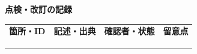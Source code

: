 \documentclass[11pt,a4paper]{article}
\begin{document}
\par{}\noindent\textbf{点検・改訂の記録}\par\vspace{1mm}
{\fontsize{8.5}{13}\selectfont
\begin{tabularx}{\linewidth}{@{}XXXX@{}}
\textbf{箇所・ID} & \textbf{記述・出典} & \textbf{確認者・状態} & \textbf{留意点}\\[2mm]
\strut & \strut & \strut & \strut\\[5mm]
\strut & \strut & \strut & \strut\\[5mm]
\strut & \strut & \strut & \strut\\[5mm]
\end{tabularx}
}\vspace{2mm}\par
\end{document}

